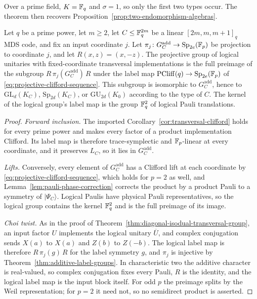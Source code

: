 Over a prime field, \(K=\mathbb F_q\) and \(\sigma=1\), so only the first two
types occur.  The theorem then recovers
Proposition~\ref{prop:two-endomorphism-algebras}.

\begin{corollary}
\label{cor:prime-power-transversal-group}
Let \(q\) be a prime power, let \(m\geq2\), let \(C\leq\mathbb F_q^{2m}\) be a
linear \([2m,m,m+1]_q\) MDS code, and fix an input coordinate \(j\).  Let
\(\pi_j\colon G^{\mathrm{add}}_C\to\mathrm{Sp}_{2e}(\mathbb F_p)\) be projection
to coordinate \(j\), and let \(R(x,z)=(x,-z)\).  The projective group of
logical unitaries with fixed-coordinate transversal implementations is the
full preimage of the subgroup \(R\,\pi_j(G^{\mathrm{add}}_C)\,R\) under
the label map \(\operatorname{PCliff}(q)\to\mathrm{Sp}_{2e}(\mathbb F_p)\) of
\eqref{eq:projective-clifford-sequence}.  This subgroup is isomorphic to
\(G^{\mathrm{add}}_C\), hence to \(\mathrm{GL}_d(K_C)\),
\(\mathrm{Sp}_{2d}(K_C)\), or \(\mathrm{GU}_{2d}(K_0)\) according to the
type of \(C\).  The kernel of the logical group's label map is the group
\(\mathbb F_q^2\) of logical Pauli translations.
\end{corollary}

\begin{proof}
\emph{Forward inclusion.}  The imported
Corollary~\ref{cor:transversal-clifford} holds for every prime power and
makes every factor of a product implementation Clifford.  Its label map is
therefore trace-symplectic and \(\mathbb F_p\)-linear at every coordinate, and it
preserves \(L_C\), so it lies in \(G^{\mathrm{add}}_C\).

\emph{Lifts.}  Conversely, every element of \(G^{\mathrm{add}}_C\) has a
Clifford lift at each coordinate by
\eqref{eq:projective-clifford-sequence}, which holds for \(p=2\) as well, and
Lemma~\ref{lem:pauli-phase-correction} corrects the product by a product
Pauli to a symmetry of \(\lvert\Psi_C\rangle\).  Logical Paulis have
physical Pauli representatives, so the logical group contains the kernel
\(\mathbb F_q^2\) and is the full preimage of its image.

\emph{Choi twist.}  As in the proof of
Theorem~\ref{thm:diagonal-isodual-transversal-group}, an input factor \(U\)
implements the logical unitary \(\overline U\), and complex conjugation
sends \(X(a)\) to \(X(a)\) and \(Z(b)\) to \(Z(-b)\).  The logical label map
is therefore \(R\,\pi_j(g)\,R\) for the label symmetry \(g\), and \(\pi_j\)
is injective by Theorem~\ref{thm:additive-label-groups}.  In characteristic
two the additive character is real-valued, so complex conjugation fixes
every Pauli, \(R\) is the identity, and the logical label map is the input
block itself.  For odd \(p\) the preimage splits by the Weil
representation; for \(p=2\) it need not, so no semidirect product is
asserted.
\end{proof}


